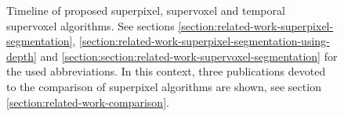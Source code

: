 \begin{figure}[t!]
\begin{tikzpicture}
	\end{tikzpicture}
	\caption[Timeline of superpixel, supervoxel and temporal supervoxel algorithms. Publications on comparing these approaches are shown as well.]{Timeline of proposed superpixel, supervoxel and temporal supervoxel algorithms. See sections \ref{section:related-work-superpixel-segmentation}, \ref{section:related-work-superpixel-segmentation-using-depth} and \ref{section:section:related-work-supervoxel-segmentation} for the used abbreviations. In this context, three publications devoted to the comparison of superpixel algorithms are shown, see section \ref{section:related-work-comparison}.
	}
	\label{fig:related-work-superpixel-timeline}
\end{figure}

